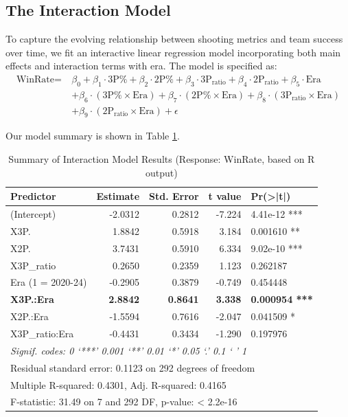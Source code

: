 \documentclass[11pt, a4paper]{article} %
\begin{document}
\subsection{The Interaction Model}

To capture the evolving relationship between shooting metrics and team success over time, we fit an interactive linear regression model incorporating both main effects and interaction terms with era. The model is specified as:
\begin{align*}
    \text{WinRate} =\ & \beta_0 + \beta_1 \cdot \text{3P\%} + \beta_2 \cdot \text{2P\%} + \beta_3 \cdot \text{3P}_{\text{ratio}} + \beta_4 \cdot \text{2P}_{\text{ratio}} + \beta_5 \cdot \text{Era} \\
    & + \beta_6 \cdot (\text{3P\%} \times \text{Era}) + \beta_7 \cdot (\text{2P\%} \times \text{Era}) + \beta_8 \cdot (\text{3P}_{\text{ratio}} \times \text{Era}) \\
    & + \beta_9 \cdot (\text{2P}_{\text{ratio}} \times \text{Era}) + \epsilon
    \end{align*}

Our model summary is shown in Table \ref{tab:interaction_summary_R}.

\begin{table}[htbp]
\centering
\caption{Summary of Interaction Model Results (Response: WinRate, based on R output)}
\label{tab:interaction_summary_R}
\begin{tabular}{lrrrl}
\toprule
Predictor & Estimate & Std. Error & t value & Pr(>|t|) \\
\midrule
(Intercept) & -2.0312 & 0.2812 & -7.224 & 4.41e-12 *** \\ 
X3P. & 1.8842 & 0.5918 & 3.184 & 0.001610 ** \\ 
X2P. & 3.7431 & 0.5910 & 6.334 & 9.02e-10 *** \\ 
X3P\_ratio & 0.2650 & 0.2359 & 1.123 & 0.262187 \\ 
Era (1 = 2020-24) & -0.2905 & 0.3879 & -0.749 & 0.454448 \\ 
\textbf{X3P.:Era} & \textbf{2.8842} & \textbf{0.8641} & \textbf{3.338} & \textbf{0.000954 ***} \\ 
X2P.:Era & -1.5594 & 0.7616 & -2.047 & 0.041509 * \\ 
X3P\_ratio:Era & -0.4431 & 0.3434 & -1.290 & 0.197976 \\ 
\midrule
\multicolumn{5}{l}{\textit{Signif. codes: 0 `***' 0.001 `**' 0.01 `*' 0.05 `.' 0.1 ` ' 1}} \\
\multicolumn{5}{l}{Residual standard error: 0.1123 on 292 degrees of freedom} \\ 
\multicolumn{5}{l}{Multiple R-squared: 0.4301, Adj. R-squared: 0.4165} \\ 
\multicolumn{5}{l}{F-statistic: 31.49 on 7 and 292 DF, p-value: < 2.2e-16} \\ 
\bottomrule
\end{tabular}
\end{table}
\end{document}
